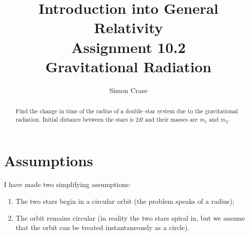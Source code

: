 \documentclass[]{article}
\title{Introduction into General Relativity\\Assignment 10.2\\Gravitational Radiation}
\author{Simon Crase}
\begin{document}
\maketitle
\tableofcontents

\begin{abstract}
Find the change in time of the radius of a double--star system due to the gravitational radiation. Initial distance between the stars is $2R$ and their masses are $m_1$ and $m_2$.

\end{abstract}

\section{Assumptions}
I have made two simplifying assumptions:
\begin{enumerate}
	\item \label{assumption:1} The two stars begin in a circular orbit (the problem speaks of a radius);
	\item \label{assumption:2} The orbit remains circular (in reality the two stars spiral in, but we assume that the orbit can be treated instantaneously as a circle). 
\end{enumerate}
\end{document}
